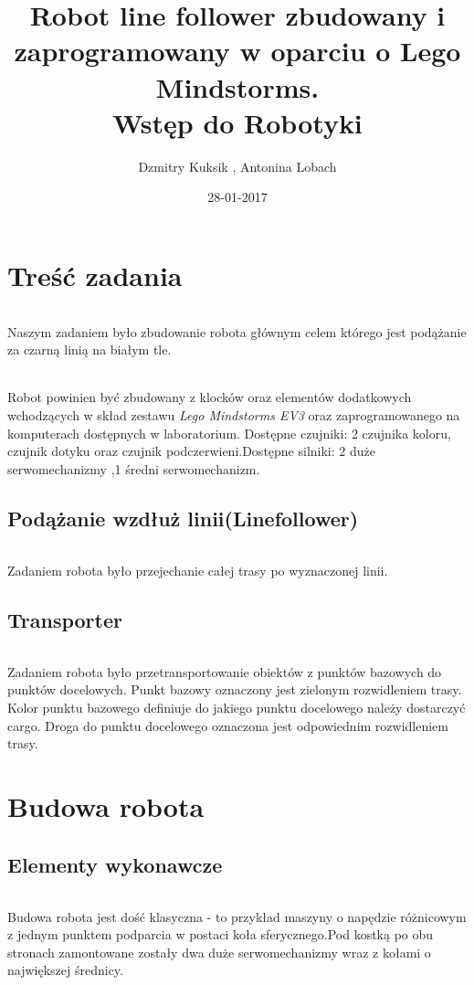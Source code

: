 \documentclass[12pt,a4paper]{report}
\begin{document}
	
	\title{Robot line follower zbudowany i\\
	zaprogramowany w oparciu o Lego Mindstorms.\\   
 	Wstęp do Robotyki}
	\date{28-01-2017}
	\author{Dzmitry Kuksik , Antonina Lobach}
  	\maketitle  
 
	\tableofcontents
	\newpage
    
    \chapter{Treść zadania}
    \subparagraph{}
    Naszym zadaniem było zbudowanie robota głównym celem którego jest podążanie za czarną linią na białym tle.
    \subparagraph{}
    Robot powinien być zbudowany z klocków oraz elementów dodatkowych wchodzących w skład zestawu \textit{Lego Mindstorms EV3} oraz zaprogramowanego na komputerach dostępnych w laboratorium. Dostępne czujniki: 2 czujnika koloru, czujnik dotyku oraz czujnik podczerwieni.Dostępne silniki: 2 duże serwomechanizmy ,1 średni serwomechanizm. 
    \section{Podążanie wzdłuż linii(Linefollower)}
    \subparagraph{}
    Zadaniem robota było przejechanie całej trasy po wyznaczonej linii.
    \section{Transporter}
    \subparagraph{}
    Zadaniem robota było przetransportowanie obiektów z punktów bazowych do punktów docelowych. Punkt bazowy oznaczony jest zielonym rozwidleniem trasy. Kolor punktu bazowego definiuje do jakiego punktu docelowego należy dostarczyć cargo. Droga do punktu docelowego oznaczona jest odpowiednim rozwidleniem trasy. 
    
    \chapter{Budowa robota}
    \section{Elementy wykonawcze}
    \subparagraph{}
    Budowa robota jest dość klasyczna - to przykład maszyny o napędzie różnicowym z jednym punktem podparcia w postaci koła sferycznego.Pod kostką po obu stronach zamontowane zostały dwa duże serwomechanizmy wraz z kołami o największej średnicy.
\end{document}
